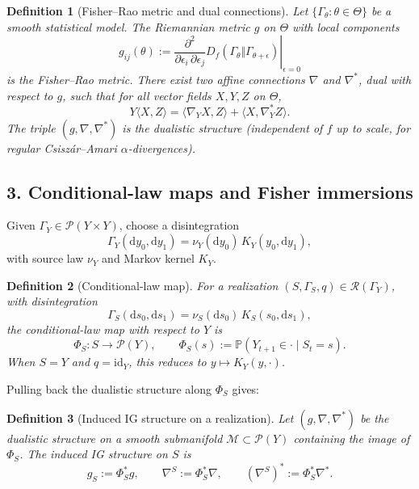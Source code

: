 \documentclass[11pt]{article}
\newtheorem{definition}{Definition}
\newcommand{\Pcal}{\mathcal{P}}
\begin{document}
\begin{definition}[Fisher--Rao metric and dual connections]
Let $\{\Gamma_\theta : \theta\in\Theta\}$ be a smooth statistical model.
The Riemannian metric $g$ on $\Theta$ with local components
\[
  g_{ij}(\theta)
  :=
  \left.
  \frac{\partial^2}{\partial \epsilon_i\,\partial \epsilon_j}
  D_f(\Gamma_\theta \Vert \Gamma_{\theta+\epsilon})
  \right|_{\epsilon=0}
\]
is the \emph{Fisher--Rao metric}. There exist two affine connections
$\nabla$ and $\nabla^\ast$, dual with respect to $g$, such that for all
vector fields $X,Y,Z$ on $\Theta$,
\[
  Y \bigl\langle X,Z \bigr\rangle
  = \bigl\langle \nabla_Y X, Z \bigr\rangle
    + \bigl\langle X, \nabla^\ast_Y Z \bigr\rangle.
\]
The triple $(g,\nabla,\nabla^\ast)$ is the \emph{dualistic structure}
(independent of $f$ up to scale, for regular Csiszár--Amari $\alpha$-divergences).
\end{definition}

\subsection*{3. Conditional-law maps and Fisher immersions}

Given $\Gamma_Y\in\Pcal(Y\times Y)$, choose a disintegration
\[
  \Gamma_Y(\mathrm dy_0,\mathrm dy_1)
  = \nu_Y(\mathrm dy_0) \, K_Y(y_0,\mathrm dy_1),
\]
with source law $\nu_Y$ and Markov kernel $K_Y$.

\begin{definition}[Conditional-law map]
\label{def:conditional-law-map}
For a realization $(S,\Gamma_S,q)\in\mathcal R(\Gamma_Y)$, with
disintegration
\[
  \Gamma_S(\mathrm ds_0,\mathrm ds_1)
  = \nu_S(\mathrm ds_0)\,K_S(s_0,\mathrm ds_1),
\]
the \emph{conditional-law map} with respect to $Y$ is
\[
  \Phi_S : S \to \Pcal(Y),
  \qquad
  \Phi_S(s) := \mathbb{P}(Y_{t+1}\in\cdot \mid S_t=s).
\]
When $S=Y$ and $q=\mathrm{id}_Y$, this reduces to $y\mapsto K_Y(y,\cdot)$.
\end{definition}

Pulling back the dualistic structure along $\Phi_S$ gives:

\begin{definition}[Induced IG structure on a realization]
Let $(g,\nabla,\nabla^\ast)$ be the dualistic structure on a smooth
submanifold $\mathcal M\subset \Pcal(Y)$ containing the image of $\Phi_S$.
The \emph{induced IG structure} on $S$ is
\[
  g_S := \Phi_S^\ast g,
  \qquad
  \nabla^S := \Phi_S^\ast \nabla,
  \qquad
  (\nabla^S)^\ast := \Phi_S^\ast \nabla^\ast.
\]
\end{definition}
\end{document}
